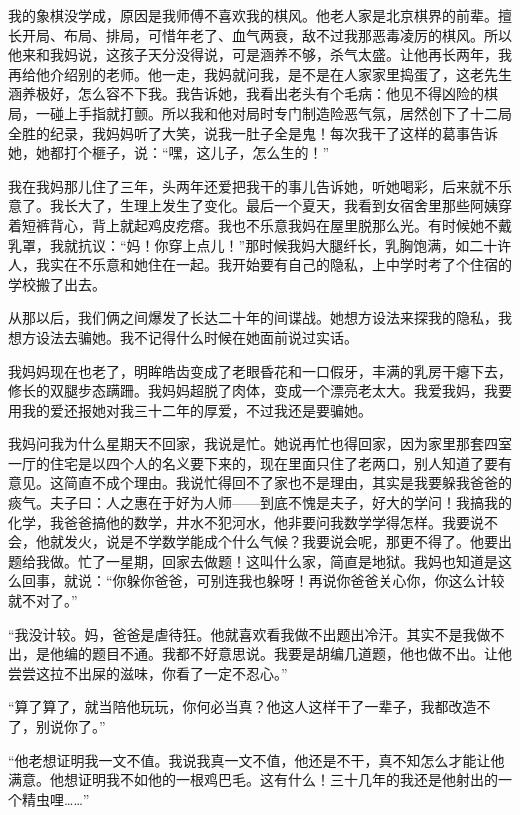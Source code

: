  我的象棋没学成，原因是我师傅不喜欢我的棋风。他老人家是北京棋界的前辈。擅长开局、布局、排局，可惜年老了、血气两衰，敌不过我那恶毒凌厉的棋风。所以他来和我妈说，这孩子天分没得说，可是涵养不够，杀气太盛。让他再长两年，我再给他介绍别的老师。他一走，我妈就问我，是不是在人家家里捣蛋了，这老先生涵养极好，怎么容不下我。我告诉她，我看出老头有个毛病：他见不得凶险的棋局，一碰上手指就打颤。所以我和他对局时专门制造险恶气氛，居然创下了十二局全胜的纪录，我妈妈听了大笑，说我一肚子全是鬼！每次我干了这样的葛事告诉她，她都打个榧子，说：“嘿，这儿子，怎么生的！” 
 
 我在我妈那儿住了三年，头两年还爱把我干的事儿告诉她，听她喝彩，后来就不乐意了。我长大了，生理上发生了变化。最后一个夏天，我看到女宿舍里那些阿姨穿着短裤背心，背上就起鸡皮疙瘩。我也不乐意我妈在屋里脱那么光。有时候她不戴乳罩，我就抗议：“妈！你穿上点儿！”那时候我妈大腿纤长，乳胸饱满，如二十许人，我实在不乐意和她住在一起。我开始要有自己的隐私，上中学时考了个住宿的学校搬了出去。 
 
 从那以后，我们俩之间爆发了长达二十年的间谍战。她想方设法来探我的隐私，我想方设法去骗她。我不记得什么时候在她面前说过实话。 
 
 我妈妈现在也老了，明眸皓齿变成了老眼昏花和一口假牙，丰满的乳房干瘪下去，修长的双腿步态蹒跚。我妈妈超脱了肉体，变成一个漂亮老太大。我爱我妈，我要用我的爱还报她对我三十二年的厚爱，不过我还是要骗她。 
 
 我妈问我为什么星期天不回家，我说是忙。她说再忙也得回家，因为家里那套四室一厅的住宅是以四个人的名义要下来的，现在里面只住了老两口，别人知道了要有意见。这简直不成个理由。我说忙得回不了家也不是理由，其实是我要躲我爸爸的痰气。夫子曰：人之惠在于好为人师——到底不愧是夫子，好大的学问！我搞我的化学，我爸爸搞他的数学，井水不犯河水，他非要问我数学学得怎样。我要说不会，他就发火，说是不学数学能成个什么气候？我要说会呢，那更不得了。他要出题给我做。忙了一星期，回家去做题！这叫什么家，简直是地狱。我妈也知道是这么回事，就说：“你躲你爸爸，可别连我也躲呀！再说你爸爸关心你，你这么计较就不对了。” 
 
 “我没计较。妈，爸爸是虐待狂。他就喜欢看我做不出题出冷汗。其实不是我做不出，是他编的题目不通。我都不好意思说。我要是胡编几道题，他也做不出。让他尝尝这拉不出屎的滋味，你看了一定不忍心。” 
 
 “算了算了，就当陪他玩玩，你何必当真？他这人这样干了一辈子，我都改造不了，别说你了。” 
 
 “他老想证明我一文不值。我说我真一文不值，他还是不干，真不知怎么才能让他满意。他想证明我不如他的一根鸡巴毛。这有什么！三十几年的我还是他射出的一个精虫哩……” 
 
